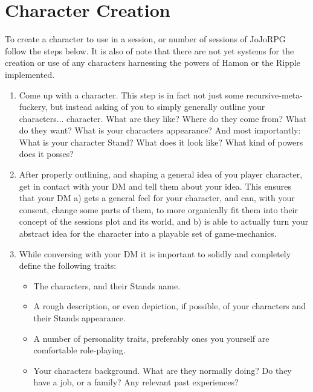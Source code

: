 \documentclass[a4paper,12pt]{article}
\begin{document}
\section{Character Creation}
To create a character to use in a session, or number of sessions of JoJoRPG follow the steps below. It is also of note that there are not yet systems for the creation or use of any characters harnessing the powers of Hamon or the Ripple implemented.
\begin{enumerate}
	\item Come up with a character. This step is in fact not just some recursive-meta-fuckery, but instead asking of you to simply generally outline your characters... character. What are they like? Where do they come from? What do they want? What is your characters appearance? And most importantly: What is your character Stand? What does it look like? What kind of powers does it posses?
	\item After properly outlining, and shaping a general idea of you player character, get in contact with your DM and tell them about your idea. This ensures that your DM a) gets a general feel for your character, and can, with your consent, change some parts of them, to more organically fit them into their concept of the sessions plot and its world, and b) is able to actually turn your abstract idea for the character into a playable set of game-mechanics.
	\item While conversing with your DM it is important to solidly and completely define the following traits:
	\begin{itemize}
		\item The characters, and their Stands name.
		\item A rough description, or even depiction, if possible, of your characters and their Stands appearance.
		\item A number of personality traits, preferably ones you yourself are comfortable role-playing.
		\item Your characters background. What are they normally doing? Do they have a job, or a family? Any relevant past experiences?

\end{itemize}
\end{enumerate}
\end{document}
